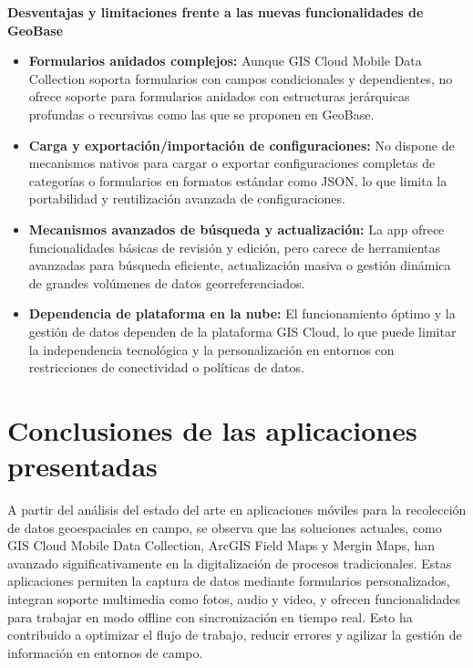 \documentclass[12pt, a4paper]{book}
\begin{document}
\textbf{Desventajas y limitaciones frente a las nuevas funcionalidades de GeoBase}

\begin{itemize}
\item \textbf{Formularios anidados complejos:} Aunque GIS Cloud Mobile Data Collection soporta formularios con campos condicionales y dependientes, no ofrece soporte para formularios anidados con estructuras jerárquicas profundas o recursivas como las que se proponen en GeoBase.

\item \textbf{Carga y exportación/importación de configuraciones:} No dispone de mecanismos nativos para cargar o exportar configuraciones completas de categorías o formularios en formatos estándar como JSON, lo que limita la portabilidad y reutilización avanzada de configuraciones.

\item \textbf{Mecanismos avanzados de búsqueda y actualización:} La app ofrece funcionalidades básicas de revisión y edición, pero carece de herramientas avanzadas para búsqueda eficiente, actualización masiva o gestión dinámica de grandes volúmenes de datos georreferenciados.

\item \textbf{Dependencia de plataforma en la nube:} El funcionamiento óptimo y la gestión de datos dependen de la plataforma GIS Cloud, lo que puede limitar la independencia tecnológica y la personalización en entornos con restricciones de conectividad o políticas de datos.
\end{itemize}

\section{Conclusiones de las aplicaciones presentadas}

A partir del análisis del estado del arte en aplicaciones móviles para la recolección de datos geoespaciales en campo, se observa que las soluciones actuales, como GIS Cloud Mobile Data Collection, ArcGIS Field Maps y Mergin Maps, han avanzado significativamente en la digitalización de procesos tradicionales. Estas aplicaciones permiten la captura de datos mediante formularios personalizados, integran soporte multimedia como fotos, audio y video, y ofrecen funcionalidades para trabajar en modo offline con sincronización en tiempo real. Esto ha contribuido a optimizar el flujo de trabajo, reducir errores y agilizar la gestión de información en entornos de campo.
\end{document}
